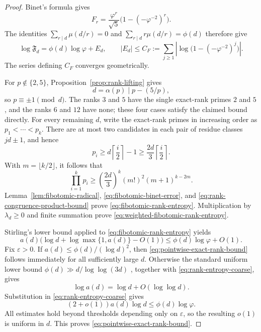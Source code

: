 \begin{proof}
Binet's formula gives
\[
 F_r=\frac{\varphi^r}{\sqrt5}
 \bigl(1-(-\varphi^{-2})^r\bigr).
\]
The identities
$\sum_{r\mid d}\mu(d/r)=0$ and
$\sum_{r\mid d}r\mu(d/r)=\phi(d)$ therefore give
\begin{equation}
\label{eq:fibotomic-binet-error}
 \log\mathfrak F_d=\phi(d)\log\varphi+E_d,
 \qquad
 |E_d|\leq
 C_F:=\sum_{j\geq1}
 \left|\log\bigl(1-(-\varphi^{-2})^j\bigr)\right|.
\end{equation}
The series defining $C_F$ converges geometrically.

For $p\notin\{2,5\}$, Proposition~\ref{prop:rank-lifting} gives
\[
 d=\alpha(p)\mid p-(5/p),
\]
so $p\equiv\pm1\pmod d$.  The ranks $3$ and $5$ have the single
exact-rank primes $2$ and $5$, and the ranks $6$ and $12$ have none; these
four cases satisfy the claimed bound directly.  For every remaining $d$,
write the exact-rank primes in increasing order as
$p_1<\cdots<p_k$.  There are at most two candidates in each pair of
residue classes $jd\pm1$, and hence
\[
 p_i\geq d\left\lceil\frac i2\right\rceil-1
 \geq\frac{2d}{3}\left\lceil\frac i2\right\rceil.
\]
With $m=\lfloor k/2\rfloor$, it follows that
\begin{equation}
\label{eq:rank-congruence-product-bound}
 \prod_{i=1}^kp_i\geq
 \left(\frac{2d}{3}\right)^k(m!)^2(m+1)^{k-2m}.
\end{equation}
Lemma~\ref{lem:fibotomic-radical},
\eqref{eq:fibotomic-binet-error}, and
\eqref{eq:rank-congruence-product-bound} prove
\eqref{eq:fibotomic-rank-entropy}.  Multiplication by
$\lambda_d\geq0$ and finite summation prove
\eqref{eq:weighted-fibotomic-rank-entropy}.

Stirling's lower bound applied to
\eqref{eq:fibotomic-rank-entropy} yields
\begin{equation}
\label{eq:rank-entropy-coarse}
 a(d)\bigl(\log d+\log\max\{1,a(d)\}-O(1)\bigr)
 \leq\phi(d)\log\varphi+O(1).
\end{equation}
Fix $\varepsilon>0$.  If
$a(d)\leq\phi(d)/(\log d)^2$, then
\eqref{eq:pointwise-exact-rank-bound} follows immediately for all
sufficiently large $d$.  Otherwise the standard uniform lower bound
$\phi(d)\gg d/\log\log(3d)$
\cite{HardyWright2008Introduction}, together with
\eqref{eq:rank-entropy-coarse}, gives
\[
 \log a(d)=\log d+O(\log\log d).
\]
Substitution in \eqref{eq:rank-entropy-coarse} gives
\[
 (2+o(1))a(d)\log d\leq\phi(d)\log\varphi.
\]
All estimates hold beyond thresholds depending only on $\varepsilon$, so
the resulting $o(1)$ is uniform in $d$.  This proves
\eqref{eq:pointwise-exact-rank-bound}.
\end{proof}

